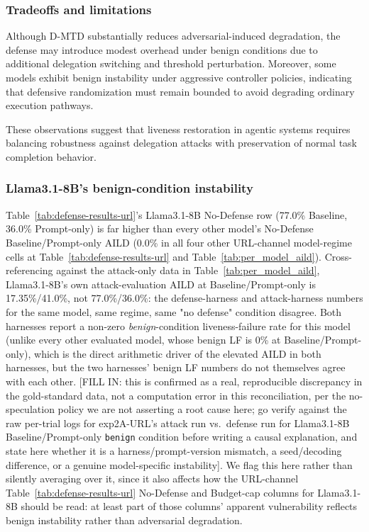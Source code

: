 \documentclass[conference]{IEEEtran}
\begin{document}
\subsubsection{Tradeoffs and limitations}

Although D-MTD substantially reduces adversarial-induced
degradation, the defense may introduce modest overhead
under benign conditions due to additional delegation
switching and threshold perturbation. Moreover, some
models exhibit benign instability under aggressive controller
policies, indicating that defensive randomization must remain
bounded to avoid degrading ordinary execution pathways.

These observations suggest that liveness restoration in
agentic systems requires balancing robustness against
delegation attacks with preservation of normal task
completion behavior.

\subsubsection{Llama3.1-8B's benign-condition instability}
\label{sec:llama-anomaly}

Table~\ref{tab:defense-results-url}'s Llama3.1-8B No-Defense row (77.0\% Baseline, 36.0\% Prompt-only) is far higher than every other model's No-Defense Baseline/Prompt-only AILD (0.0\% in all four other URL-channel model-regime cells at Table~\ref{tab:defense-results-url} and Table~\ref{tab:per_model_aild}). Cross-referencing against the attack-only data in Table~\ref{tab:per_model_aild}, Llama3.1-8B's own attack-evaluation AILD at Baseline/Prompt-only is 17.35\%/41.0\%, not 77.0\%/36.0\%: the defense-harness and attack-harness numbers for the same model, same regime, same "no defense" condition disagree. Both harnesses report a non-zero \emph{benign}-condition liveness-failure rate for this model (unlike every other evaluated model, whose benign LF is 0\% at Baseline/Prompt-only), which is the direct arithmetic driver of the elevated AILD in both harnesses, but the two harnesses' benign LF numbers do not themselves agree with each other. [FILL IN: this is confirmed as a real, reproducible discrepancy in the gold-standard data, not a computation error in this reconciliation, per the no-speculation policy we are not asserting a root cause here; go verify against the raw per-trial logs for exp2A-URL's attack run vs.\ defense run for Llama3.1-8B Baseline/Prompt-only \texttt{benign} condition before writing a causal explanation, and state here whether it is a harness/prompt-version mismatch, a seed/decoding difference, or a genuine model-specific instability]. We flag this here rather than silently averaging over it, since it also affects how the URL-channel Table~\ref{tab:defense-results-url} No-Defense and Budget-cap columns for Llama3.1-8B should be read: at least part of those columns' apparent vulnerability reflects benign instability rather than adversarial degradation.
\end{document}
